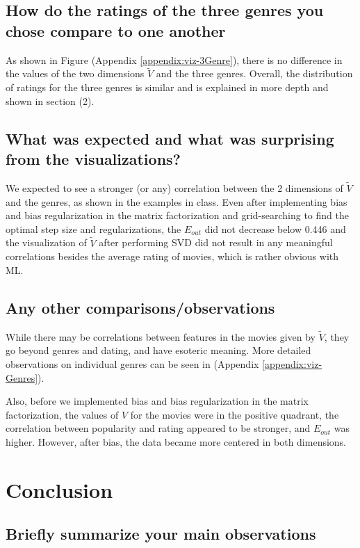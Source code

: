 \subsection*{How do the ratings of the three genres you chose compare to one another}
As shown in Figure (Appendix \ref{appendix:viz-3Genre}), there is no difference in the values of the two dimensions $\widetilde{V}$ and the three genres. Overall, the distribution of ratings for the three genres is similar and is explained in more depth and shown in section (2).

\subsection*{What was expected and what was surprising from the visualizations?}
We expected to see a stronger (or any) correlation between the 2 dimensions of $\widetilde{V}$ and the genres, as shown in the examples in class. Even after implementing bias and bias regularization in the matrix factorization and grid-searching to find the optimal step size and regularizations, the $E_{out}$ did not decrease below 0.446 and the visualization of $\widetilde{V}$ after performing SVD did not result in any meaningful correlations besides the average rating of movies, which is rather obvious with ML.

\subsection*{Any other comparisons/observations}
While there may be correlations between features in the movies given by $\widetilde{V}$, they go beyond genres and dating, and have esoteric meaning. More detailed observations on individual genres can be seen in  (Appendix \ref{appendix:viz-Genres}).

Also, before we implemented bias and bias regularization in the matrix factorization, the values of $V$ for the movies were in the positive quadrant, the correlation between popularity and rating appeared to be stronger, and $E_{out}$ was higher. However, after bias, the data became more centered in both dimensions.


\section{Conclusion}
\medskip
\subsection*{Briefly summarize your main observations}
